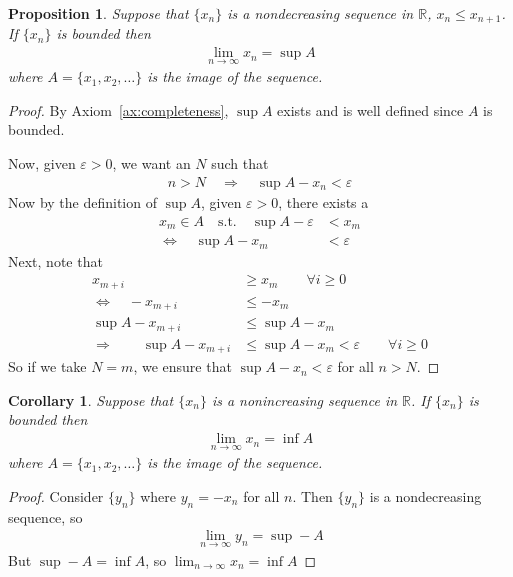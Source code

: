 \documentclass[12pt]{article}
\numberwithin{equation}{section} %
\theoremstyle{plain}
\newtheorem{prop}[thm]{Proposition}
\newtheorem{cor}[thm]{Corollary}
\theoremstyle{definition}
\theoremstyle{remark}
\newcommand{\R}{\mathbb{R}}
\begin{document}
\begin{prop}
Suppose that $\{x_n\}$ is a nondecreasing sequence in $\R$, $x_n \leq
x_{n+1}$. If $\{x_n\}$ is bounded then
\begin{align*}
  \lim_{n\rightarrow \infty} x_n = \sup A
\end{align*}
where $A=\{x_1,x_2,\ldots\}$ is the image of the sequence.
\end{prop}
\begin{proof}
By Axiom~\ref{ax:completeness}, $\sup A$ exists and is well defined
since $A$ is bounded.

Now, given $\varepsilon>0$, we want an $N$ such that
\begin{align*}
  n>N\quad\Rightarrow\quad
  \sup A - x_n < \varepsilon
\end{align*}
Now by the definition of $\sup A$, given $\varepsilon>0$, there exists a
\begin{align*}
  x_m \in A
  \quad \text{s.t.} \quad
  \sup A - \varepsilon &< x_m\\
  \Leftrightarrow\quad
  \sup A - x_m&< \varepsilon
\end{align*}
Next, note that
\begin{align*}
  x_{m+i} &\geq x_m
  \qquad \forall i \geq 0 \\
  \Leftrightarrow\quad
  -x_{m+i} &\leq -x_m \\
  \sup A -x_{m+i} &\leq \sup A-x_m \\
  \Rightarrow \qquad
  \sup A -x_{m+i} &\leq \sup A-x_m < \varepsilon
  \qquad \forall i \geq 0
\end{align*}
So if we take $N=m$, we ensure that $\sup A - x_n< \varepsilon$ for all
$n>N$.
\end{proof}

\begin{cor}
\label{cor:nonincreasing}
Suppose that $\{x_n\}$ is a nonincreasing sequence in $\R$. If
$\{x_n\}$ is bounded then
\begin{align*}
  \lim_{n\rightarrow \infty} x_n = \inf A
\end{align*}
where $A=\{x_1,x_2,\ldots\}$ is the image of the sequence.
\end{cor}
\begin{proof}
Consider $\{y_n\}$ where $y_n = -x_n$ for all $n$. Then $\{y_n\}$ is a
nondecreasing sequence, so
\begin{align*}
  \lim_{n\rightarrow \infty} y_n = \sup -A
\end{align*}
But $\sup -A = \inf A$, so $\lim_{n\rightarrow \infty} x_n = \inf A$
\end{proof}
\end{document}
